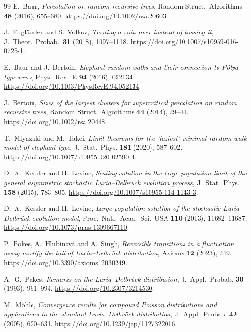 \documentclass[EJP,preprint]{ejpecp}
\begin{document}
\begin{thebibliography}{99}
E.~Baur, \emph{Percolation on random recursive trees}, Random Struct.\
Algorithms \textbf{48} (2016), 655--680.
\url{https://doi.org/10.1002/rsa.20603}.

J.~Engl\"ander and S.~Volkov, \emph{Turning a coin over instead of tossing
it}, J.\ Theor.\ Probab.\ \textbf{31} (2018), 1097--1118.
\url{https://doi.org/10.1007/s10959-016-0725-1}.

E.~Baur and J.~Bertoin, \emph{Elephant random walks and their connection to
P\'olya-type urns}, Phys.\ Rev.\ E \textbf{94} (2016), 052134.
\url{https://doi.org/10.1103/PhysRevE.94.052134}.

J.~Bertoin, \emph{Sizes of the largest clusters for supercritical percolation
on random recursive trees}, Random Struct.\ Algorithms \textbf{44} (2014),
29--44. \url{https://doi.org/10.1002/rsa.20448}.

T.~Miyazaki and M.~Takei, \emph{Limit theorems for the `laziest' minimal
random walk model of elephant type}, J.~Stat.~Phys. \textbf{181} (2020),
587--602.
\url{https://doi.org/10.1007/s10955-020-02590-4}.

D.~A.~Kessler and H.~Levine, \emph{Scaling solution in the large population
limit of the general asymmetric stochastic Luria--Delbr\"uck evolution
process}, J.~Stat.~Phys. \textbf{158} (2015), 783--805.
\url{https://doi.org/10.1007/s10955-014-1143-3}.

D.~A.~Kessler and H.~Levine, \emph{Large population solution of the
stochastic Luria--Delbr\"uck evolution model}, Proc.\ Natl.\ Acad.\ Sci.\ USA
\textbf{110} (2013), 11682--11687.
\url{https://doi.org/10.1073/pnas.1309667110}.

P.~Bokes, A.~Hlubinov\'a and A.~Singh, \emph{Reversible transitions in a
fluctuation assay modify the tail of Luria--Delbr\"uck distribution}, Axioms
\textbf{12} (2023), 249.
\url{https://doi.org/10.3390/axioms12030249}.

A.~G.~Pakes, \emph{Remarks on the Luria--Delbr\"uck distribution},
J.~Appl.~Probab. \textbf{30} (1993), 991--994.
\url{https://doi.org/10.2307/3214530}.

M.~M\"ohle, \emph{Convergence results for compound Poisson distributions
and applications to the standard Luria--Delbr\"uck distribution},
J.~Appl.~Probab. \textbf{42} (2005), 620--631.
\url{https://doi.org/10.1239/jap/1127322016}.


\end{thebibliography}
\end{document}
